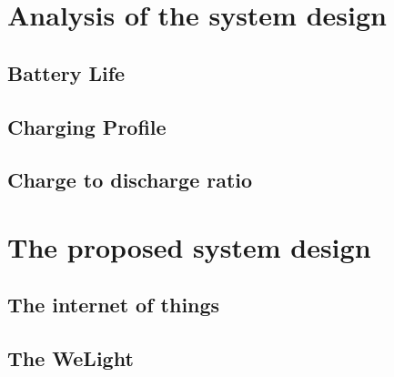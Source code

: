 \documentclass[a4paper, 10pt]{article}
\begin{document}

\section{Analysis of the system design}
\label{sec:analysis}


\subsection{Battery Life}
\label{sec:battery}


\subsection{Charging Profile}
\label{sec:charging}


\subsection{Charge to discharge ratio}
\label{sec:chargedischarge}


\section{The proposed system design}
\label{sec:proposed}



\subsection{The internet of things}
\label{sec:internet}


\subsection{The WeLight}
\label{sec:WeLight}

\end{document}
